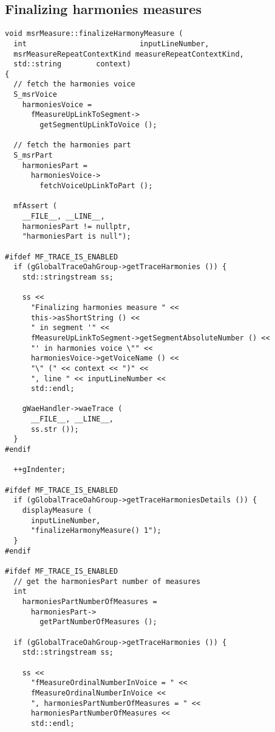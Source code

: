 \subsection{Finalizing harmonies measures}

\begin{lstlisting}[language=CPlusPlus]
void msrMeasure::finalizeHarmonyMeasure (
  int                          inputLineNumber,
  msrMeasureRepeatContextKind measureRepeatContextKind,
  std::string        context)
{
  // fetch the harmonies voice
  S_msrVoice
    harmoniesVoice =
      fMeasureUpLinkToSegment->
        getSegmentUpLinkToVoice ();

  // fetch the harmonies part
  S_msrPart
    harmoniesPart =
      harmoniesVoice->
        fetchVoiceUpLinkToPart ();

  mfAssert (
    __FILE__, __LINE__,
    harmoniesPart != nullptr,
    "harmoniesPart is null");

#ifdef MF_TRACE_IS_ENABLED
  if (gGlobalTraceOahGroup->getTraceHarmonies ()) {
    std::stringstream ss;

    ss <<
      "Finalizing harmonies measure " <<
      this->asShortString () <<
      " in segment '" <<
      fMeasureUpLinkToSegment->getSegmentAbsoluteNumber () <<
      "' in harmonies voice \"" <<
      harmoniesVoice->getVoiceName () <<
      "\" (" << context << ")" <<
      ", line " << inputLineNumber <<
      std::endl;

    gWaeHandler->waeTrace (
      __FILE__, __LINE__,
      ss.str ());
  }
#endif

  ++gIndenter;

#ifdef MF_TRACE_IS_ENABLED
  if (gGlobalTraceOahGroup->getTraceHarmoniesDetails ()) {
    displayMeasure (
      inputLineNumber,
      "finalizeHarmonyMeasure() 1");
  }
#endif

#ifdef MF_TRACE_IS_ENABLED
  // get the harmoniesPart number of measures
  int
    harmoniesPartNumberOfMeasures =
      harmoniesPart->
        getPartNumberOfMeasures ();

  if (gGlobalTraceOahGroup->getTraceHarmonies ()) {
    std::stringstream ss;

    ss <<
      "fMeasureOrdinalNumberInVoice = " <<
      fMeasureOrdinalNumberInVoice <<
      ", harmoniesPartNumberOfMeasures = " <<
      harmoniesPartNumberOfMeasures <<
      std::endl;


\end{lstlisting}
